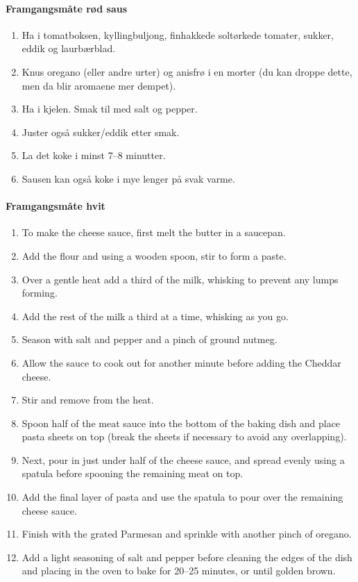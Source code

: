 \documentclass[12pt,a4paper]{book}
\begin{document}
{\paragraph{Framgangsmåte rød saus}
\begin{enumerate}[noitemsep]
	\item Ha i tomatboksen, kyllingbuljong, finhakkede soltørkede tomater, sukker, eddik og laurbærblad.
	\item Knus oregano (eller andre urter) og anisfrø i en morter (du kan droppe dette, men da blir aromaene mer dempet).
	\item Ha i kjelen. Smak til med salt og pepper.
	\item Juster også sukker/eddik etter smak.
	\item La det koke i minst 7--8 minutter.
	\item Sausen kan også koke i mye lenger på svak varme.
	\end{enumerate}

	\paragraph{Framgangsmåte hvit}
	\begin{enumerate}[noitemsep]
	\item To make the cheese sauce, first melt the butter in a saucepan.
	\item Add the flour and using a wooden spoon, stir to form a paste.
	\item Over a gentle heat add a third of the milk, whisking to prevent any lumps forming.
	\item Add the rest of the milk a third at a time, whisking as you go.
	\item Season with salt and pepper and a pinch of ground nutmeg.
	\item Allow the sauce to cook out for another minute before adding the Cheddar cheese.
	\item Stir and remove from the heat.
	\item Spoon half of the meat sauce into the bottom of the baking dish and place pasta sheets on top (break the sheets if necessary to avoid any overlapping).
	\item Next, pour in just under half of the cheese sauce, and spread evenly using a spatula before spooning the remaining meat on top.
	\item Add the final layer of pasta and use the spatula to pour over the remaining cheese sauce.
	\item Finish with the grated Parmesan and sprinkle with another pinch of oregano.
	\item Add a light seasoning of salt and pepper before cleaning the edges of the dish and placing in the oven to bake for 20--25 minutes, or until golden brown.
\end{enumerate}


}
\end{document}
